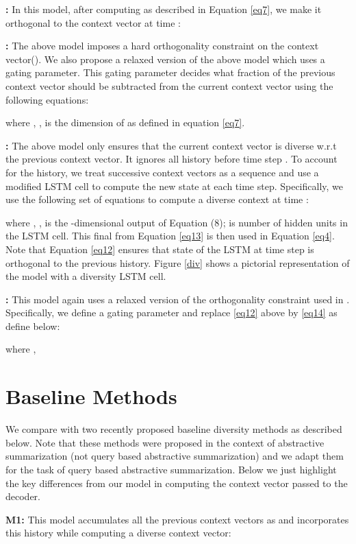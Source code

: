 \documentclass[11pt]{article}
\begin{document}
\noindent\textbf{:} In this model, after computing  as described in Equation \eqref{eq7}, we make it orthogonal to the context vector at time :

\noindent\textbf{:} The above model imposes a hard orthogonality constraint on the context vector(). We also propose a relaxed version of the above model which uses a gating parameter. This gating parameter decides what fraction of the previous context vector should be subtracted from the current context vector using the following equations:

where , ,  is the dimension of  as defined in equation \eqref{eq7}.

\noindent\textbf{:} The above model only ensures that the current context vector is diverse w.r.t the previous context vector. It ignores all history before time step . To account for the history, we treat successive context vectors as a sequence and use a modified LSTM cell   to compute the new state at each time step. Specifically, we use the following set of equations to compute a diverse context at time :



where , ,  is the -dimensional output of Equation (8);  is number of hidden units in the LSTM cell. This final  from Equation \eqref{eq13} is then used in Equation \eqref{eq4}. Note that Equation \eqref{eq12} ensures that state of the LSTM at time step  is orthogonal to the previous history. Figure \ref{div} shows a pictorial representation of the model with a diversity LSTM cell.


\noindent\textbf{:} This model again uses a relaxed version of the orthogonality constraint used in \textbf{}. Specifically, we define a gating parameter  and replace \eqref{eq12} above by \eqref{eq14} as define below:

where ,  


\section{Baseline Methods}
We compare with two recently proposed baseline diversity methods \cite{chen2016distraction} as described below. Note that these methods were proposed in the context of abstractive summarization (not query based abstractive summarization) and we adapt them for the task of query based abstractive summarization. Below we just highlight the key differences from our model in computing the context vector  passed to the decoder.

\noindent\textbf{M1:} This model accumulates all the previous context vectors as  and incorporates this history while computing a diverse context vector:
\end{document}
